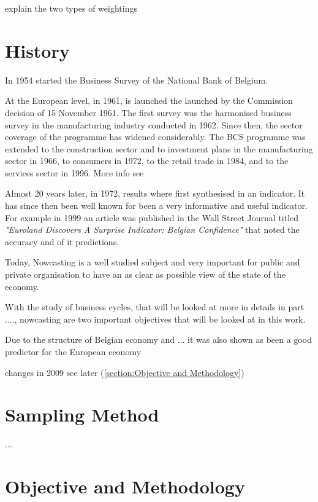 \documentclass[12pt,a4paper,oneside]{book}
\begin{document}
explain the two types of weightings

\section{History}

In 1954 started the Business Survey of the National Bank of Belgium. 

At the European level, in 1961, is launched the launched by the Commission decision of 15 November 1961. The first survey was the harmonised business survey in the manufacturing industry conducted in 1962. Since then, the sector coverage of the programme has widened considerably. The BCS programme was extended to the construction sector and to investment plans in the manufacturing sector in 1966, to consumers in 1972, to the retail trade in 1984, and to the services sector in 1996.
More info see \citep{european_commission_joint_nodate}

Almost 20 years later, in 1972, results where first synthesised in an indicator. It has since then been well known for been a very informative and useful indicator. For example in 1999 an article was published in the Wall Street Journal titled \textit{"Euroland Discovers A Surprise Indicator: Belgian Confidence"} \citep{rhoads_euroland_1999} that noted the accuracy and of it predictions.

Today, Nowcasting is a well studied subject and very important for public and private organisation to have an as clear as possible view of the state of the economy.

With the study of business cycles, that will be looked at more in details in part ...., nowcasting are two important objectives that will be looked at in this work.

Due to the structure of Belgian economy and ... it was also shown as been a good predictor for the European economy \cite{vanhaelen_belgian_2000}

changes in 2009 see later (\autoref{section:Objective and Methodology})


\section{Sampling Method}

...

\section{Objective and Methodology}
\label{section:Objective and Methodology}
\end{document}
